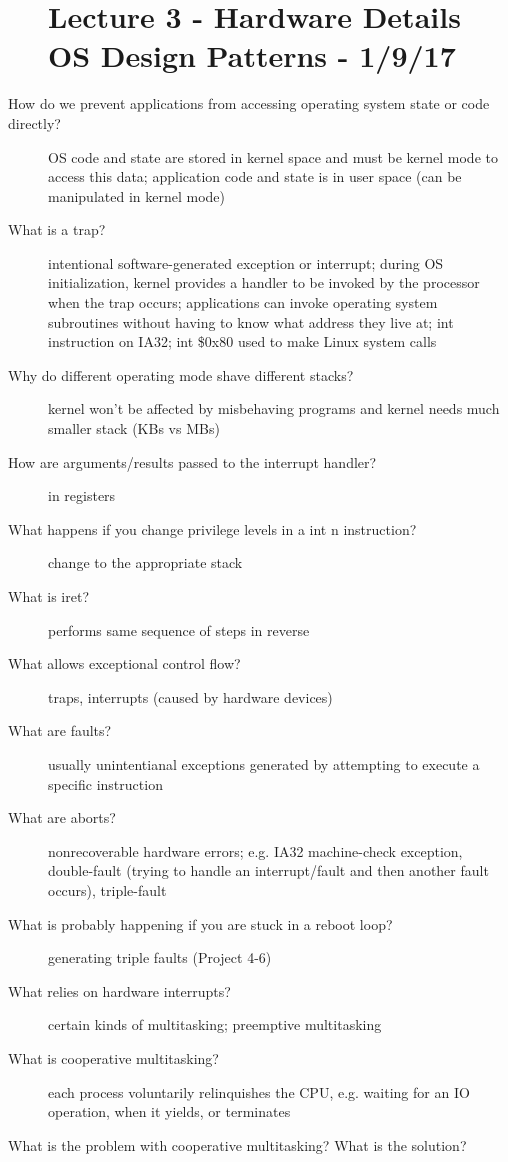 \documentclass[10pt]{article}
\begin{document}
\begin{description}
\section{Lecture 3 - Hardware Details OS Design Patterns - 1/9/17}
\item[How do we prevent applications from accessing operating system state or code directly?]
  OS code and state are stored in kernel space and must be kernel mode to access this data;
  application code and state is in user space (can be manipulated in kernel mode)
\item[What is a trap?]
  intentional software-generated exception or interrupt;
  during OS initialization, kernel provides a handler to be invoked by the processor when the trap occurs;
  applications can invoke operating system subroutines without having to know what address they live at;
  int instruction on IA32; int \$0x80 used to make Linux system calls
\item[Why do different operating mode shave different stacks?]
  kernel won't be affected by misbehaving programs and kernel needs much smaller stack (KBs vs MBs)
\item[How are arguments/results passed to the interrupt handler?]
  in registers
\item[What happens if you change privilege levels in a int n instruction?]
  change to the appropriate stack
\item[What is iret?]
  performs same sequence of steps in reverse
\item[What allows exceptional control flow?]
  traps, interrupts (caused by hardware devices)
\item[What are faults?]
  usually unintentianal exceptions generated by attempting to execute a specific instruction
\item[What are aborts?]
  nonrecoverable hardware errors; e.g. IA32 machine-check exception, double-fault (trying to handle an interrupt/fault and then another fault occurs), triple-fault
\item[What is probably happening if you are stuck in a reboot loop?]
  generating triple faults (Project 4-6)
\item[What relies on hardware interrupts?]
  certain kinds of multitasking; preemptive multitasking
\item[What is cooperative multitasking?]
  each process voluntarily relinquishes the CPU, e.g. waiting for an IO operation, when it yields, or terminates
\item[What is the problem with cooperative multitasking? What is the solution?]

\end{description}
\end{document}
